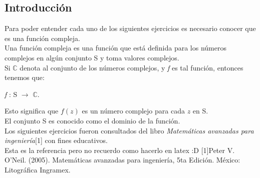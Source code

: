 \subsection*{Introducci\'on}
\justify
Para poder entender cada uno de los siguientes ejercicios es necesario conocer que es una funci\'on compleja.\\
 
Una funci\'on compleja es una funci\'on que est\'a definida para los n\'umeros complejos en alg\'un
conjunto S y toma valores complejos.\\
Si $\mathbb{C}$ denota al conjunto de los n\'umeros complejos, y \textit{f} es
tal funci\'on, entonces tenemos que: \\
\begin{center}
\textit{f} : S $\rightarrow$ $\mathbb{C}$.\\
\end{center}
 
Esto significa que $f(z)$ es un n\'umero complejo para cada $z$ en S.\\
El conjunto S es conocido como el dominio de la funci\'on.\\


Los siguientes ejercicios fueron consultados del libro \textit{Matem\'aticas avanzadas para ingenier\'ia}[1] con fines educativos.\\


Esta es la referencia pero no recuerdo como hacerlo en latex :D
[1]Peter V. O'Neil. (2005). Matem\'aticas avanzadas para ingenier\'ia, 5ta Edici\'on. M\'exico: Litogr\'afica Ingramex.
